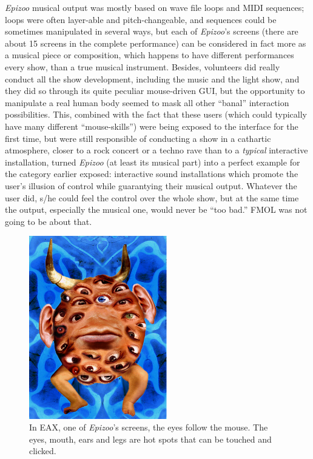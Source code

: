 \textit{Epizoo} musical output was mostly  based on wave file loops and MIDI sequences;
loops were often layer-able and pitch-changeable, and sequences could be
sometimes manipulated in several ways, but each of \textit{Epizoo}'s screens (there are
about 15 screens in the complete performance) can be considered  in fact more as
 a  musical piece or  composition, which  happens  to have different
performances every show, than a true musical instrument.  Besides,  volunteers 
did  really  conduct  all  the show  development, including  the  music  and  the
 light show, and they did so through  its quite peculiar mouse-driven GUI, but the
opportunity  to manipulate a real human body  seemed to mask all other ``banal''
interaction possibilities. This, combined with the fact that these users (which
could typically have many different ``mouse-skills'') were being exposed to the
interface for the first time, but were still responsible of conducting a show in
a cathartic atmosphere, closer to a rock concert or  a  techno  rave than  to  a 
\textit{typical} interactive installation, turned \textit{Epizoo} (at least its musical part) into
a perfect example for the category earlier exposed: interactive sound 
installations  which  promote  the  user's  illusion   of control while
guarantying their musical output. Whatever the user did, s/he could feel the
control  over the whole show, but at the same time the output, especially  the
musical one, would never be ``too bad.'' FMOL was not going to be about that.

\begin{figure}[t]
\centering
\includegraphics[width=6cm]{Fig1.png}
\caption{In EAX, one of \textit{Epizoo}'s screens, the eyes follow the mouse. The eyes,
mouth, ears and legs are hot spots that can be touched and clicked.}
\label{Jorda:fig:epizoo} 
\end{figure}

